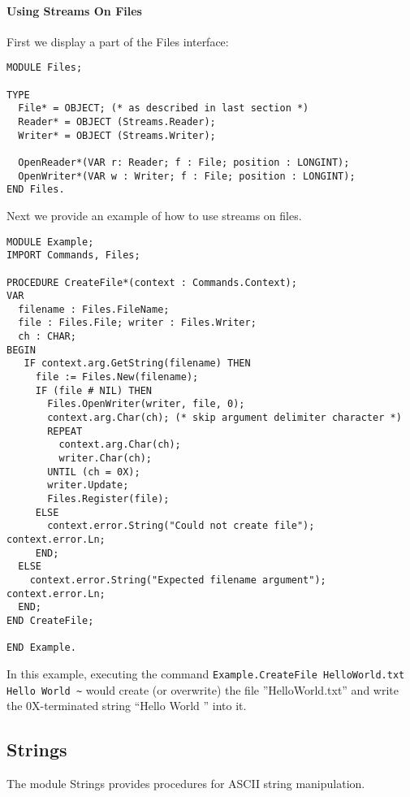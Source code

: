\documentclass[a4paper,11pt]{article}
\begin{document}
\paragraph{Using Streams On Files}

First we display a part of the Files interface:
\begin{lstlisting}[language=Oberon,frame=none,caption={Using Streams On Files}]
MODULE Files;

TYPE
  File* = OBJECT; (* as described in last section *)
  Reader* = OBJECT (Streams.Reader);
  Writer* = OBJECT (Streams.Writer);

  OpenReader*(VAR r: Reader; f : File; position : LONGINT);
  OpenWriter*(VAR w : Writer; f : File; position : LONGINT);
END Files.
\end{lstlisting}

Next we provide an example of how to use streams on files.
\begin{lstlisting}[language=Oberon,frame=none,caption={Example: Create A New File}]
MODULE Example;
IMPORT Commands, Files;

PROCEDURE CreateFile*(context : Commands.Context);
VAR
  filename : Files.FileName;
  file : Files.File; writer : Files.Writer;
  ch : CHAR;
BEGIN
   IF context.arg.GetString(filename) THEN
     file := Files.New(filename);
     IF (file # NIL) THEN
       Files.OpenWriter(writer, file, 0);
       context.arg.Char(ch); (* skip argument delimiter character *)
       REPEAT
         context.arg.Char(ch);
         writer.Char(ch);
       UNTIL (ch = 0X);
       writer.Update;
       Files.Register(file);
     ELSE
       context.error.String("Could not create file"); context.error.Ln;
     END;
  ELSE
    context.error.String("Expected filename argument"); context.error.Ln;
  END;
END CreateFile;

END Example.
\end{lstlisting}

In this example, executing the command \verb+Example.CreateFile HelloWorld.txt Hello World ~+ would create (or overwrite) the file ''HelloWorld.txt'' and write the 0X-terminated string ``Hello World '' into it.

\subsection{Strings}
The module Strings provides procedures for ASCII string manipulation.
\end{document}
